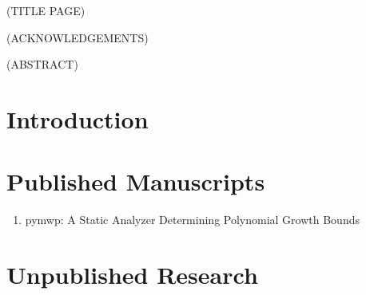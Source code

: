 \documentclass[letterpaper,11pt]{article}
\title{\EDSTITLE}
\author{\EDSAUTHOR}
\begin{document}
(TITLE PAGE)

\newpage(ACKNOWLEDGEMENTS)



\newpage(ABSTRACT)

\newpage
\tableofcontents\newpage
\listoftables\newpage
\listoffigures\newpage

\setcounter{section}{0}
\section{Introduction}\label{sec:introduction}


\section{Published Manuscripts}\label{sec:published-manuscripts}
\begin{enumerate}[label=\Alph*]
\item pymwp: A Static Analyzer Determining Polynomial Growth Bounds
\end{enumerate}


\section{Unpublished Research}\label{sec:unpublished-research}
\end{document}
